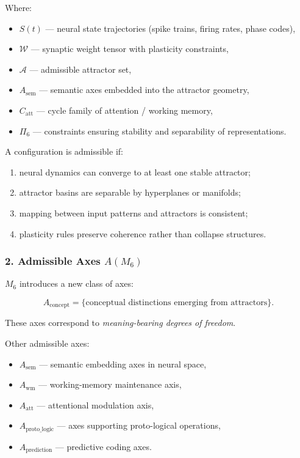 Where:

\begin{itemize}
    \item $S(t)$ — neural state trajectories (spike trains, firing rates, phase codes),
    \item $\mathcal{W}$ — synaptic weight tensor with plasticity constraints,
    \item $\mathcal{A}$ — admissible attractor set,
    \item $A_{\mathrm{sem}}$ — semantic axes embedded into the attractor geometry,
    \item $C_{\mathrm{att}}$ — cycle family of attention / working memory,
    \item $\Pi_6$ — constraints ensuring stability and separability of representations.
\end{itemize}

A configuration is admissible if:

\begin{enumerate}
    \item neural dynamics can converge to at least one stable attractor;
    \item attractor basins are separable by hyperplanes or manifolds;
    \item mapping between input patterns and attractors is consistent;
    \item plasticity rules preserve coherence rather than collapse structures.
\end{enumerate}

\subsubsection*{2. Admissible Axes \texorpdfstring{$A(M_6)$}{A(M_6)}}

$M_6$ introduces a new class of axes:

\[
A_{\mathrm{concept}} = \{ \text{conceptual distinctions emerging from attractors} \}.
\]

These axes correspond to \emph{meaning-bearing degrees of freedom}.

Other admissible axes:

\begin{itemize}
    \item $A_{\mathrm{sem}}$ — semantic embedding axes in neural space,
    \item $A_{\mathrm{wm}}$ — working-memory maintenance axis,
    \item $A_{\mathrm{att}}$ — attentional modulation axis,
    \item $A_{\mathrm{proto\_logic}}$ — axes supporting proto-logical operations,
    \item $A_{\mathrm{prediction}}$ — predictive coding axes.
\end{itemize}


